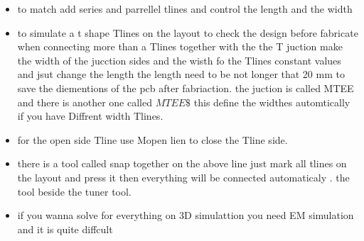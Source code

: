 \documentclass{article}
\begin{document}
\begin{itemize}
    \item to match add series and parrellel tlines and control the length and the width 
    \item to simulate a t shape Tlines on the layout to check the design before fabricate 
    when connecting more than a Tlines together with the the T juction make the width  of the jucction sides and the wisth fo the Tlines constant values and jsut change the length
     the length need to be not longer that 20 mm to save the diementions of the pcb after fabriaction.
     the juction is called MTEE and there is another one called  $MTEE\$$ this define the widthes automtically if you have Diffrent width Tlines.
    \item  for the open side Tline  use Mopen lien to close the Tline side.
    \item  there is a tool called snap together on the above line just mark all tlines on the layout and press it then everything will be connected automaticaly .  the tool beside the tuner tool.
    \item if you wanna solve for everything on 3D simulattion you need EM simulation and it is quite diffcult 

\end{itemize}
\end{document}

